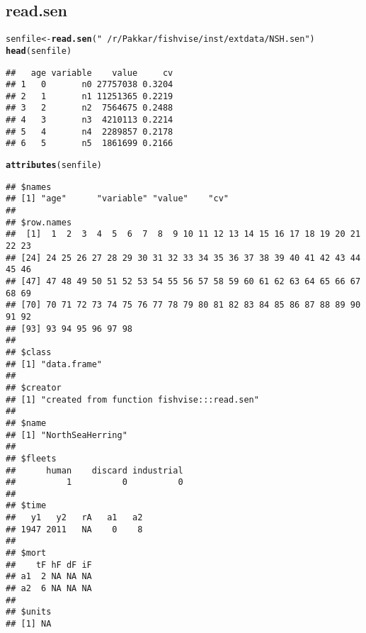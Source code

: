 \documentclass[a4paper]{article}\usepackage{graphicx, color}
\makeatletter
\newcommand{\hlfunctioncall}[1]{\textcolor[rgb]{0.501960784313725,0,0.329411764705882}{\textbf{#1}}}%
\newcommand{\hlstring}[1]{\textcolor[rgb]{0.6,0.6,1}{#1}}%
\newenvironment{kframe}{%
 \def\at@end@of@kframe{}%
 \ifinner\ifhmode%
  \def\at@end@of@kframe{\end{minipage}}%
  \begin{minipage}{\columnwidth}%
 \fi\fi%
 \def\FrameCommand##1{\hskip\@totalleftmargin \hskip-\fboxsep
 \colorbox{shadecolor}{##1}\hskip-\fboxsep
     \hskip-\linewidth \hskip-\@totalleftmargin \hskip\columnwidth}%
 \MakeFramed {\advance\hsize-\width
   \@totalleftmargin\z@ \linewidth\hsize
   \@setminipage}}%
 {\par\unskip\endMakeFramed%
 \at@end@of@kframe}
\newenvironment{knitrout}{}{} %
\makeatother
\begin{document}
\subsection*{read.sen}
\begin{knitrout}
\color{fgcolor}\begin{kframe}
\begin{alltt}
senfile <- \hlfunctioncall{read.sen}(\hlstring{"~/r/Pakkar/fishvise/inst/extdata/NSH.sen"})
\hlfunctioncall{head}(senfile)
\end{alltt}
\begin{verbatim}
##   age variable    value     cv
## 1   0       n0 27757038 0.3204
## 2   1       n1 11251365 0.2219
## 3   2       n2  7564675 0.2488
## 4   3       n3  4210113 0.2214
## 5   4       n4  2289857 0.2178
## 6   5       n5  1861699 0.2166
\end{verbatim}
\begin{alltt}
\hlfunctioncall{attributes}(senfile)
\end{alltt}
\begin{verbatim}
## $names
## [1] "age"      "variable" "value"    "cv"      
## 
## $row.names
##  [1]  1  2  3  4  5  6  7  8  9 10 11 12 13 14 15 16 17 18 19 20 21 22 23
## [24] 24 25 26 27 28 29 30 31 32 33 34 35 36 37 38 39 40 41 42 43 44 45 46
## [47] 47 48 49 50 51 52 53 54 55 56 57 58 59 60 61 62 63 64 65 66 67 68 69
## [70] 70 71 72 73 74 75 76 77 78 79 80 81 82 83 84 85 86 87 88 89 90 91 92
## [93] 93 94 95 96 97 98
## 
## $class
## [1] "data.frame"
## 
## $creator
## [1] "created from function fishvise:::read.sen"
## 
## $name
## [1] "NorthSeaHerring"
## 
## $fleets
##      human    discard industrial 
##          1          0          0 
## 
## $time
##   y1   y2   rA   a1   a2 
## 1947 2011   NA    0    8 
## 
## $mort
##    tF hF dF iF
## a1  2 NA NA NA
## a2  6 NA NA NA
## 
## $units
## [1] NA
\end{verbatim}
\end{kframe}
\end{knitrout}

\newpage{}
\end{document}
